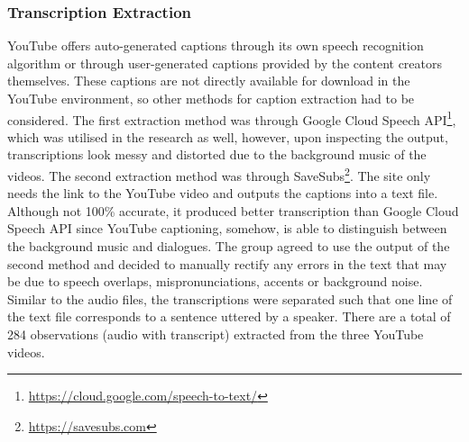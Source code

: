 \documentclass{article}
\newenvironment{subs}
  {\adjustwidth{3em}{0pt}}
  {\endadjustwidth}
\begin{document}
\begin{subs}
\subsubsection*{Transcription Extraction}
YouTube offers auto-generated captions through its own speech recognition algorithm or through user-generated captions provided by the content creators themselves. These captions are not directly available for download in the YouTube environment, so other methods for caption extraction had to be considered. The first extraction method was through Google Cloud Speech API\footnote{\url{https://cloud.google.com/speech-to-text/}}, which was utilised in the research as well, however, upon inspecting the output, transcriptions look messy and distorted due to the background music of the videos. The second extraction method was through SaveSubs\footnote{\url{https://savesubs.com}}. The site only needs the link to the YouTube video and outputs the captions into a text file. Although not 100\% accurate, it produced better transcription than Google Cloud Speech API since YouTube captioning, somehow, is able to distinguish between the background music and dialogues. The group agreed to use the output of the second method and decided to manually rectify any errors in the text that may be due to speech overlaps, mispronunciations, accents or background noise. Similar to the audio files, the transcriptions were separated such that one line of the text file corresponds to a sentence uttered by a speaker. There are a total of 284 observations (audio with transcript) extracted from the three YouTube videos.
\end{subs}
\end{document}
